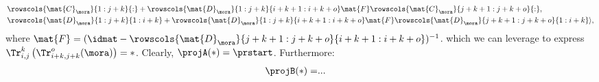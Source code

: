 {\begin{example}
\begin{equation}
\begin{aligned}
                                                 & \rowscols{\mat{C}_\mora}{1:j+k}{:}+\rowscols{\mat{D}_\mora}{1:j+k}{i+k+1:i+k+o}\mat{F}\rowscols{\mat{C}_\mora}{j+k+1:j+k+o}{:}, \\
                                                 & \rowscols{\mat{D}_\mora}{1:j+k}{1:i+k}+\rowscols{\mat{D}_\mora}{1:j+k}{i+k+1:i+k+o}\mat{F} \rowscols{\mat{D}_\mora}{j+k+1:j+k+o}{1:i+k}\rangle,
            \end{aligned}
        \end{equation}
        where $\mat{F}=(\idmat-\rowscols{\mat{D}_\mora}{j+k+1:j+k+o}{i+k+1:i+k+o})^{-1}$.
        which we can leverage to express $\Tr_{i,j}^{k}\left(\Tr_{i+k,j+k}^o(\mora)\right)=\ast$.
        Clearly, $\projA(\ast)=\prstart$.
        Furthermore:
        \begin{equation*}
            \begin{aligned}
                \projB(\ast)= & .
                ..
            \end{aligned}
        \end{equation*}


\end{example}}
